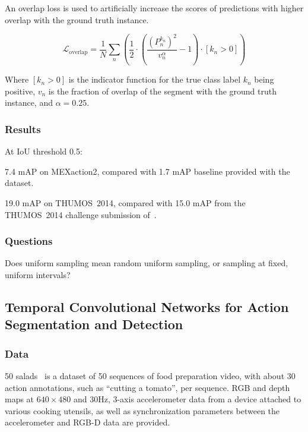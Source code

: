 \documentclass[a4paper, 12pt]{article}
\begin{document}
An overlap loss is used to artificially increase the scores of predictions with
higher overlap with the ground truth instance.

\begin{equation}
        \mathcal{L}_{\textrm{overlap}} = \frac{1}{N} \sum_n
                \left(\frac{1}{2} \cdot
                        \left(
                                \frac{{\left( P_n^{k_n} \right)}^2}{v_n^\alpha}
                                - 1
                        \right)
                        \cdot \left[ k_n > 0 \right]
                \right)
\end{equation}

Where $\left[ k_n > 0 \right]$ is the indicator function for the true class
label $k_n$ being positive, $v_n$ is the fraction of overlap of the segment
with the ground truth instance, and $\alpha = 0.25$.

\subsubsection{Results}

At IoU threshold 0.5:

7.4 mAP on MEXaction2, compared with 1.7 mAP baseline provided with the
dataset.

19.0 mAP on THUMOS~2014, compared with 15.0 mAP from the THUMOS~2014 challenge
submission of~\cite{LearSubmissionThumos2014}.

\subsubsection{Questions}

Does uniform sampling mean random uniform sampling, or sampling at fixed,
uniform intervals?

\subsection{Temporal Convolutional Networks for Action Segmentation and
            Detection\cite{DBLP:journals/corr/LeaFVRH16}}

\subsubsection{Data}

50 salads~\cite{Stein:2013:CEA:2493432.2493482} is a dataset of 50 sequences of
food preparation video, with about 30 action annotations, such as ``cutting a
tomato'', per sequence. RGB and depth maps at $640 \times 480$ and 30Hz, 3-axis
accelerometer data from a device attached to various cooking utensils, as well
as synchronization parameters between the accelerometer and RGB-D data are
provided.
\end{document}
